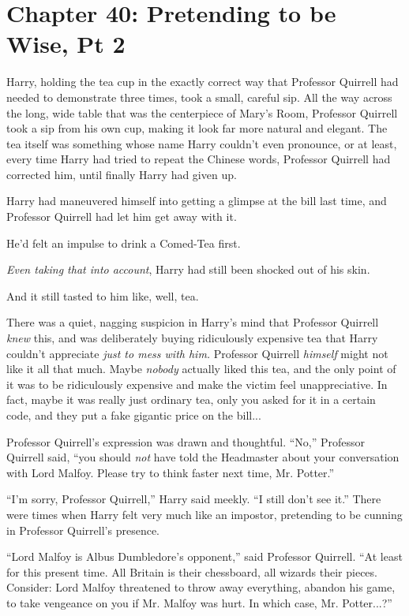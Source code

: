 \chapter{Chapter 40: Pretending to be Wise, Pt 2}
Harry, holding the tea cup in the exactly correct way that Professor Quirrell had needed to demonstrate three times, took a small, careful sip. All the way across the long, wide table that was the centerpiece of Mary's Room, Professor Quirrell took a sip from his own cup, making it look far more natural and elegant. The tea itself was something whose name Harry couldn't even pronounce, or at least, every time Harry had tried to repeat the Chinese words, Professor Quirrell had corrected him, until finally Harry had given up.

Harry had maneuvered himself into getting a glimpse at the bill last time, and Professor Quirrell had let him get away with it.

He'd felt an impulse to drink a Comed-Tea first.

\emph{Even taking that into account}, Harry had still been shocked out of his skin.

And it still tasted to him like, well, tea.

There was a quiet, nagging suspicion in Harry's mind that Professor Quirrell \emph{knew} this, and was deliberately buying ridiculously expensive tea that Harry couldn't appreciate \emph{just to mess with him.} Professor Quirrell \emph{himself} might not like it all that much. Maybe \emph{nobody} actually liked this tea, and the only point of it was to be ridiculously expensive and make the victim feel unappreciative. In fact, maybe it was really just ordinary tea, only you asked for it in a certain code, and they put a fake gigantic price on the bill...

Professor Quirrell's expression was drawn and thoughtful. ``No,'' Professor Quirrell said, ``you should \emph{not} have told the Headmaster about your conversation with Lord Malfoy. Please try to think faster next time, Mr. Potter.''

``I'm sorry, Professor Quirrell,'' Harry said meekly. ``I still don't see it.'' There were times when Harry felt very much like an impostor, pretending to be cunning in Professor Quirrell's presence.

``Lord Malfoy is Albus Dumbledore's opponent,'' said Professor Quirrell. ``At least for this present time. All Britain is their chessboard, all wizards their pieces. Consider: Lord Malfoy threatened to throw away everything, abandon his game, to take vengeance on you if Mr. Malfoy was hurt. In which case, Mr. Potter...?''

